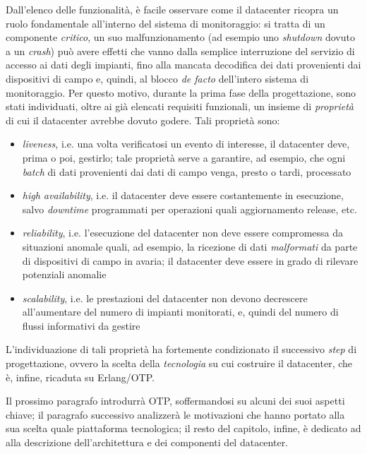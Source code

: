 %
Dall'elenco delle funzionalit\`a, \`e facile osservare come il
datacenter ricopra un ruolo fondamentale all'interno del sistema di monitoraggio: 
si tratta di un componente \emph{critico}, un suo malfunzionamento 
(ad esempio uno \emph{shutdown} dovuto a un \emph{crash}) pu\`o avere effetti che 
vanno dalla semplice interruzione del servizio di accesso ai dati degli impianti, 
fino alla mancata decodifica dei dati provenienti dai dispositivi di campo e, 
quindi, al blocco \emph{de facto} dell'intero sistema di monitoraggio.
%
Per questo motivo, durante la prima fase della progettazione, sono stati 
individuati, oltre ai gi\`a elencati requisiti funzionali, un insieme di 
\emph{propriet\`a} di cui il datacenter avrebbe dovuto godere. Tali propriet\`a 
sono:
%
\begin{itemize}
\item \emph{liveness}, i.e. una volta verificatosi un evento di interesse, 
il datacenter deve, prima o poi, gestirlo; tale propriet\`a serve a garantire, ad 
esempio, che ogni \emph{batch} di dati provenienti dai dati di campo venga, 
presto o tardi, processato
%
\item \emph{high availability}, i.e. il datacenter deve essere costantemente 
in esecuzione, salvo \emph{downtime} programmati per operazioni quali 
aggiornamento release, etc.
%
\item \emph{reliability}, i.e. l'esecuzione del datacenter non deve essere 
compromessa da situazioni anomale quali, ad esempio, la ricezione di dati 
\emph{malformati} da parte di dispositivi di campo in avaria; il datacenter 
deve essere in grado di rilevare potenziali anomalie
%
\item \emph{scalability}, i.e. le prestazioni del datacenter non devono 
decrescere all'aumentare del numero di impianti monitorati, e, quindi del numero di 
flussi informativi da gestire
%
\end{itemize}
%

%
L'individuazione di tali propriet\`a ha fortemente condizionato il successivo \emph{step} di
progettazione, ovvero la scelta della \emph{tecnologia} su cui costruire il 
datacenter, che \`e, infine, ricaduta su Erlang/OTP.
%

%
Il prossimo paragrafo introdurr\`a OTP, soffermandosi su alcuni dei suoi aspetti 
chiave; il paragrafo successivo analizzer\`a le motivazioni che hanno portato alla 
sua scelta quale piattaforma tecnologica; il resto del capitolo, infine, \`e dedicato 
ad alla descrizione dell'architettura e dei componenti del datacenter.
%

